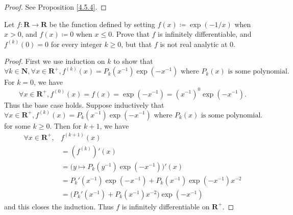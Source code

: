 \begin{proof}
    See Proposition \ref{4.5.4}.
\end{proof}

\begin{exercise}\label{ex 4.5.4}
    Let \(f : \mathbf{R} \to \mathbf{R}\) be the function defined by setting \(f(x) \coloneqq \exp(-1 / x)\) when \(x > 0\), and \(f(x) \coloneqq 0\) when \(x \leq 0\).
    Prove that \(f\) is infinitely differentiable, and \(f^{(k)}(0) = 0\) for every integer \(k \geq 0\), but that \(f\) is not real analytic at \(0\).
\end{exercise}

\begin{proof}
    First we use induction on \(k\) to show that
    \[
        \forall k \in \mathbf{N}, \forall x \in \mathbf{R}^+, f^{(k)}(x) = P_k(x^{-1}) \exp(-x^{-1}) \text{ where } P_k(x) \text{ is some polynomial}.
    \]
    For \(k = 0\), we have
    \[
        \forall x \in \mathbf{R}^+, f^{(0)}(x) = f(x) = \exp(-x^{-1}) = (x^{-1})^0 \exp(-x^{-1}).
    \]
    Thus the base case holds.
    Suppose inductively that
    \[
        \forall x \in \mathbf{R}^+, f^{(k)}(x) = P_k(x^{-1}) \exp(-x^{-1}) \text{ where } P_k(x) \text{ is some polynomial}.
    \]
    for some \(k \geq 0\).
    Then for \(k + 1\), we have
    \begin{align*}
        \forall x \in \mathbf{R}^+, & f^{(k + 1)}(x)                                                  \\
                                    & = (f^{(k)})'(x)                                                 \\
                                    & = \bigg(y \mapsto P_k(y^{-1}) \exp(-x^{-1})\bigg)'(x)           \\
                                    & = P_k'(x^{-1}) \exp(-x^{-1}) + P_k(x^{-1}) \exp(-x^{-1}) x^{-2} \\
                                    & = \big(P_k'(x^{-1}) + P_k(x^{-1}) x^{-2}\big) \exp(-x^{-1})
    \end{align*}
    and this closes the induction.
    Thus \(f\) is infinitely differentiable on \(\mathbf{R}^+\).


\end{proof}
